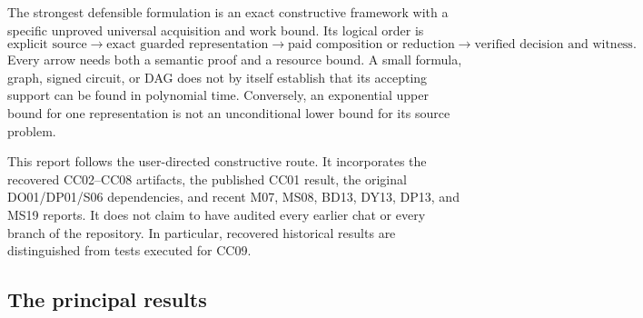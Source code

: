 \documentclass[11pt,letterpaper]{article}
\theoremstyle{definition}
\begin{document}
The strongest defensible formulation is an exact constructive framework with a specific unproved universal acquisition and work bound. Its logical order is
\[
\text{explicit source}
\longrightarrow \text{exact guarded representation}
\longrightarrow \text{paid composition or reduction}
\longrightarrow \text{verified decision and witness}.
\]
Every arrow needs both a semantic proof and a resource bound. A small formula, graph, signed circuit, or DAG does not by itself establish that its accepting support can be found in polynomial time. Conversely, an exponential upper bound for one representation is not an unconditional lower bound for its source problem.

This report follows the user-directed constructive route. It incorporates the recovered CC02--CC08 artifacts, the published CC01 result, the original DO01/DP01/S06 dependencies, and recent M07, MS08, BD13, DY13, DP13, and MS19 reports. It does not claim to have audited every earlier chat or every branch of the repository. In particular, recovered historical results are distinguished from tests executed for CC09.

\subsection{The principal results}
\end{document}
